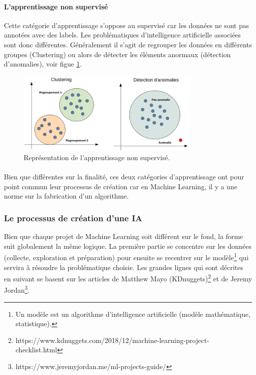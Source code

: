 \documentclass[10pt, french, a4paper]{report}
\begin{document}
\paragraph{L'apprentissage non supervisé}
Cette catégorie d'apprentissage s'oppose au supervisé car les données ne sont pas annotées avec des labels. Les problématiques d'intelligence artificielle associées sont donc différentes. Généralement il s'agit de regrouper les données en différents groupes (Clustering) ou alors de détecter les éléments anormaux (détection d'anomalies), voir figue \ref{fig:apprentissage_non_supervise}.

\begin{figure}[hbt!]
    \centering
    \includegraphics[width=0.8\textwidth]{images/apprentissage_non_supervise.png}
    \caption{Représentation de l'apprentissage non supervisé.}
    \label{fig:apprentissage_non_supervise}
\end{figure}

\paragraph{}
Bien que différentes sur la finalité, ces deux catégories d'apprentissage ont pour point commun leur processus de création car en Machine Learning, il y a une norme sur la fabrication d'un algorithme.

\subsubsection{Le processus de création d'une IA}

Bien que chaque projet de Machine Learning soit différent sur le fond, la forme suit globalement la même logique. La première partie se concentre sur les données (collecte, exploration et préparation) pour ensuite se recentrer sur le modèle\footnote{Un modèle est un algorithme d’intelligence artificielle (modèle mathématique, statistique).} qui servira à résoudre la problématique choisie. Les grandes lignes qui sont décrites en suivant se basent sur les articles de Matthew Mayo (KDnuggets)\footnote{https://www.kdnuggets.com/2018/12/machine-learning-project-checklist.html} et de Jeremy Jordan\footnote{https://www.jeremyjordan.me/ml-projects-guide/}.
\end{document}
